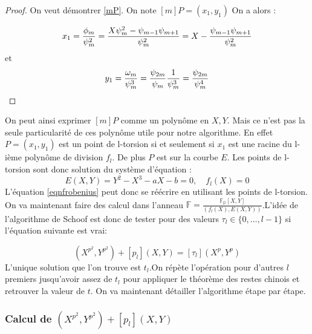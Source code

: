 \documentclass{article}
\begin{document}
\begin{proof}
On veut démontrer \ref{mP}. 
\newline
On note $[m]P = (x_1, y_1)$ 
On a alors : 


\begin{equation*}
x_1 = \frac{\phi_m}{\psi^2_m}\\
    =  \frac{X \psi^2_m - \psi_{m-1}\psi_{m+1}}{\psi_m^2} \\
    = X - \frac{\psi_{m-1}\psi_{m+1}}{\psi_m^2}
\end{equation*}
et 
\begin{equation*}
y_1 = \frac{\omega_m}{\psi^3_m} \\
	= \frac{\psi_{2m}}{\psi_m} \frac{1}{\psi_m^3} \\
	= \frac{\psi_{2m}}{\psi_m^4}
\end{equation*}
\end{proof}

On peut ainsi exprimer $[m]P$ comme un polynôme en $X,Y$. Mais ce n'est pas la seule particularité de ces polynôme utile pour notre algorithme. En effet $P = (x_1, y_1)$ est un point de l-torsion si et seulement si $x_1$ est une racine du l-ième polynôme de division $f_l$. De plus $P$ est sur la courbe $E$. Les points de l-torsion sont donc solution du système d'équation : 
\begin{equation}
E(X,Y) = Y^2 - X^3 - aX - b = 0, \quad f_l(X) = 0
\end{equation}
L'équation \ref{eqnfrobenius} peut donc se réécrire en utilisant les points de l-torsion. On va maintenant faire des calcul dans l'anneau $\mathbb{F}= \frac{\mathbb{F_p}[X,Y]}{(f_l(X), E(X,Y))}$.L'idée de l'algorithme de Schoof est donc de tester pour des valeurs $\tau_l \in \lbrace 0, \ldots, l-1 \rbrace$ si l'équation suivante est vrai:

\begin{equation}
(X^{p^2}, Y^{p^2}) + [p_l](X,Y) = [\tau_l](X^{p}, Y^{p})
\end{equation}
L'unique solution que l'on trouve est $t_l$.On répète l'opération pour d'autres $l$ premiers jusqu'avoir assez de $t_l$ pour appliquer le théorème des restes chinois et retrouver la valeur de $t$.
\newline
\medskip
On va maintenant détailler l'algorithme étape par étape. 


\subsubsection{Calcul de $(X^{p^2}, Y^{p^2}) + [p_l](X,Y)$}
\end{document}
